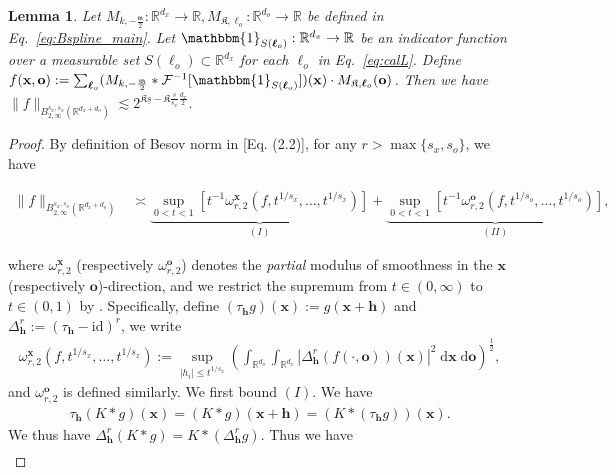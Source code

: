 \documentclass[11pt]{article}
\newcommand{\one}{\mathbbm{1}}
\newcommand{\bx}{\mathbf x}
\newcommand{\bo}{\mathbf o}
\newcommand{\calF}{\mathcal{F}}
\newcommand{\bl}{{\boldsymbol\ell}}
\newcommand{\R}{\mathbb{R}}
\newcommand{\0}{\mathbf{0}}
\newcommand{\bh}{\boldsymbol{h}}
\newtheorem{lem}{Lemma}[section]
\begin{document}
\begin{appendix}
\begin{lem}\label{lem:new_besov_mask}
Let $M_{k,-\frac{\mathfrak{m}}{2}}: \R^{d_x}\to\R, M_{\mathfrak{K},\bl_o}:\R^{d_o}\to\R$ be defined in Eq.~\eqref{eq:Bspline_main}. 
Let $\one_{S(\bl_o)}:\R^{d_x}\to\R$ be an indicator function over a measurable set $S(\bl_o)\subset\R^{d_x}$ for each $\bl_o$ in Eq.~\eqref{eq:calL}. 
Define $f(\bx,\bo):= \sum_{\bl_o}(M_{k,-\frac{\mathfrak{m}}{2}} \ast \calF^{-1}[\one_{S(\bl_o)}])(\bx) \cdot M_{\mathfrak{K},\bl_o}(\bo)$. Then we have
    $\|f\|_{B^{s_x,s_o}_{2,\infty}(\mathbb{R}^{d_x+d_o})}\lesssim 2^{\mathfrak{K}\underline{s} - \mathfrak{K}\frac{\underline{s}}{s_x}\frac{d_x}{2}}$.
\end{lem}
\begin{proof}
By definition of Besov norm in \citet{leisner_nonlinear_wavelet_approximation_2003}[Eq. (2.2)], for any $r > \max\{s_x, s_o\}$, we have
\begin{small}
\begin{align*}
    \|f\|_{B^{s_x,s_o}_{2,\infty}(\mathbb{R}^{d_x+d_o})} &\asymp \underbrace{\sup_{0<t<1}\left[t^{-1}\omega^{\bx}_{r,2}(f,t^{1/s_x},\dots,t^{1/s_x})\right]}_{(I)} + \underbrace{\sup_{0<t<1}\left[t^{-1}\omega^{\bo}_{r,2}(f,t^{1/s_o},\dots,t^{1/s_o})\right]}_{(II)},
\end{align*}
\end{small}
where $\omega_{r,2}^{\bx}$ (respectively $\omega_{r,2}^{\bo}$) denotes the \emph{partial} modulus of smoothness in the $\bx$ (respectively $\bo$)-direction, and we restrict the supremum from $t\in (0,\infty)$ to $t\in (0,1)$ by \citet[Theorem 10.1]{devore1993constructive}. Specifically, define $(\tau_{\mathbf{h}}g)(\bx) := g(\bx + \mathbf{h})$ and $\Delta^{r}_{\mathbf{h}} := (\tau_{\mathbf{h}} - \mathrm{id})^r$, we write
\begin{align*}
    \omega^{\bx}_{r,2}(f, t^{1/s_x},\dots, t^{1/s_x})
    :=\sup_{|h_i|\leq t^{1/s_x}}\left(\int_{\mathbb{R}^{d_o}}\int_{\mathbb{R}^{d_x}} \left|\Delta^{r}_{\bh}(f(\cdot, \bo))(\bx)\right|^2 \;\mathrm{d}\bx\;\mathrm{d}\bo\right)^{\frac{1}{2}},
\end{align*}
and $\omega_{r,2}^{\bo}$ is defined similarly. We first bound $(I)$.  We have
\begin{align*}
    \tau_{\mathbf{h}}(K\ast g)(\bx) = (K\ast g)(\bx + \mathbf{h}) = (K \ast (\tau_{\mathbf{h}}g))(\bx) .
\end{align*}
We thus have $\Delta^{r}_{\mathbf{h}}(K\ast g) = K\ast \left(\Delta^{r}_{\mathbf{h}}g\right)$. Thus we have
\begin{align*}

\end{align*}
\end{proof}
\end{appendix}
\end{document}
